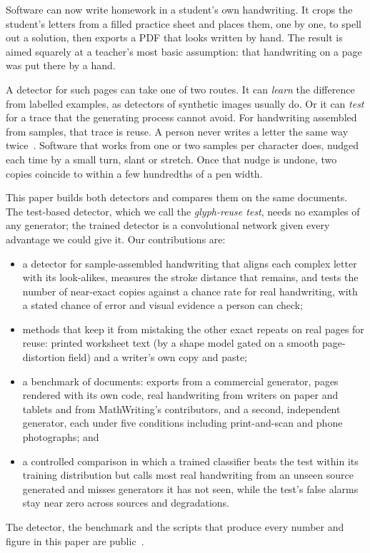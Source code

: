 \documentclass[conference]{IEEEtran}
\begin{document}
Software can now write homework in a student's own handwriting. It crops the student's letters from a filled
practice sheet and places them, one by one, to spell out a solution, then exports a PDF that looks written by hand.
The result is aimed squarely at a teacher's most basic assumption: that handwriting on a page was put there by a hand.

A detector for such pages can take one of two routes. It can \emph{learn} the difference from labelled examples,
as detectors of synthetic images usually do. Or it can \emph{test} for a trace that the generating process cannot
avoid. For handwriting assembled from samples, that trace is reuse. A person never writes a letter the same way
twice~\cite{srihari2002individuality}. Software that works from one or two samples per character does, nudged each
time by a small turn, slant or stretch. Once that nudge is undone, two copies coincide to within a few hundredths of
a pen width.

This paper builds both detectors and compares them on the same documents. The test-based detector, which we call
the \emph{glyph-reuse test}, needs no examples of any generator; the trained detector is a convolutional network
given every advantage we could give it. Our contributions are:
\begin{itemize}
\item a detector for sample-assembled handwriting that aligns each complex letter with its look-alikes, measures the
  stroke distance that remains, and tests the number of near-exact copies against a chance rate for real handwriting,
  with a stated chance of error and visual evidence a person can check;
\item methods that keep it from mistaking the other exact repeats on real pages for reuse: printed worksheet text
  (by a shape model gated on a smooth page-distortion field) and a writer's own copy and paste;
\item a benchmark of \NumDocs{} documents: exports from a commercial generator, \NumRenders{} pages rendered with its own
  code, real handwriting from \NumRealWriters{} writers on paper and tablets and from MathWriting's contributors, and a
  second, independent generator, each under five conditions including print-and-scan and phone photographs; and
\item a controlled comparison in which a trained classifier beats the test within its training distribution but calls
  most real handwriting from an unseen source generated and misses generators it has not seen, while the test's false
  alarms stay near zero across sources and degradations.
\end{itemize}
The detector, the benchmark and the scripts that produce every number and figure in this paper are
public~\cite{inkcheck}.
\end{document}
